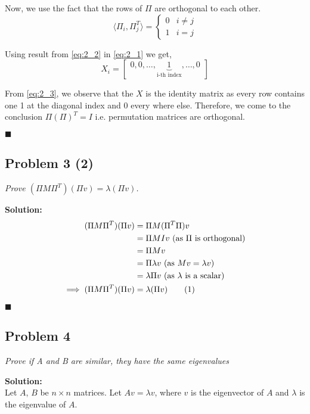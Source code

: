 \documentclass[12pt,a4paper]{article}
\newcommand\numberthis{\addtocounter{equation}{1}\tag{\theequation}}
\newcommand{\rightqed}{
\begin{flushright}
$\blacksquare$
\end{flushright}
}
\newcommand{\solution}{\noindent\textbf{Solution:}\\}
\begin{document}
Now, we use the fact that the rows of $\Pi$ are orthogonal to each other.
\begin{equation}
    \langle \Pi_i, \Pi_j^T \rangle = \begin{cases}
    0 & i \neq j \\
    1 & i = j
    \end{cases} \label{eq:2_2}
\end{equation}

Using result from \eqref{eq:2_2} in \eqref{eq:2_1} we get,
\begin{equation}
    X_i =
    \begin{bmatrix}
        0, 0, \hdots, \underbrace{1}_{\text{i-th index}}, \hdots, 0
    \end{bmatrix} \label{eq:2_3}
\end{equation}

From \eqref{eq:2_3}, we observe that the $X$ is the identity matrix as every row contains one 1 at the diagonal index and 0 every where else. Therefore, we come to the conclusion $\Pi(\Pi)^T = I$ i.e. permutation matrices are orthogonal.
\rightqed

\subsection*{Problem 3 (2)}
\textit{
    Prove $(\Pi M\Pi^T)(\Pi v) = \lambda (\Pi v)$.
}

\solution
\begin{align*}
    (\Pi M\Pi^T)(\Pi v) &= \Pi M(\Pi^T \Pi)v \\
                &= \Pi MIv \text{ (as $\Pi$ is orthogonal)} \\
                &= \Pi Mv \\
                &= \Pi \lambda v \text{ (as $Mv=\lambda v$)} \\
                &= \lambda \Pi v \text{ (as $\lambda$ is a scalar)} \\
    \implies (\Pi M\Pi^T)(\Pi v) &= \lambda (\Pi v) \numberthis
\end{align*}
\rightqed

\newpage
\subsection*{Problem 4}
\textit{
    Prove if A and B are similar, they have the same eigenvalues
}

\solution

Let $A$, $B$ be $n \times n$ matrices. Let $Av = \lambda v$, where $v$ is the eigenvector of $A$ and $\lambda$ is the eigenvalue of $A$.
\end{document}
